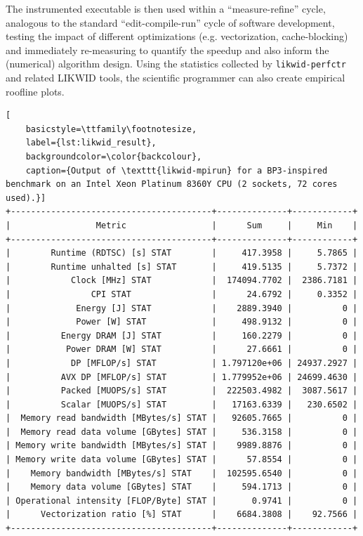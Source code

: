 \documentclass[a4paper,12pt]{article}
\begin{document}
The instrumented executable is then used within a ``measure-refine'' cycle, analogous
to the standard ``edit-compile-run'' cycle of software development, testing
the impact of different optimizations (e.g. vectorization, cache-blocking) and
immediately re-measuring to quantify the speedup and also inform the (numerical) algorithm design.
Using the statistics collected by \texttt{likwid-perfctr} and related LIKWID tools,
the scientific programmer can also create empirical roofline plots.

\begin{lstlisting}[
    basicstyle=\ttfamily\footnotesize,
    label={lst:likwid_result},
    backgroundcolor=\color{backcolour},
    caption={Output of \texttt{likwid-mpirun} for a BP3-inspired benchmark on an Intel Xeon Platinum 8360Y CPU (2 sockets, 72 cores used).}]
+----------------------------------------+--------------+------------+
|                 Metric                 |      Sum     |     Min    |
+----------------------------------------+--------------+------------+
|        Runtime (RDTSC) [s] STAT        |     417.3958 |     5.7865 |
|        Runtime unhalted [s] STAT       |     419.5135 |     5.7372 |
|            Clock [MHz] STAT            |  174094.7702 |  2386.7181 |
|                CPI STAT                |      24.6792 |     0.3352 |
|             Energy [J] STAT            |    2889.3940 |          0 |
|             Power [W] STAT             |     498.9132 |          0 |
|          Energy DRAM [J] STAT          |     160.2279 |          0 |
|           Power DRAM [W] STAT          |      27.6661 |          0 |
|            DP [MFLOP/s] STAT           | 1.797120e+06 | 24937.2927 |
|          AVX DP [MFLOP/s] STAT         | 1.779952e+06 | 24699.4630 |
|          Packed [MUOPS/s] STAT         |  222503.4982 |  3087.5617 |
|          Scalar [MUOPS/s] STAT         |   17163.6339 |   230.6502 |
|  Memory read bandwidth [MBytes/s] STAT |   92605.7665 |          0 |
|  Memory read data volume [GBytes] STAT |     536.3158 |          0 |
| Memory write bandwidth [MBytes/s] STAT |    9989.8876 |          0 |
| Memory write data volume [GBytes] STAT |      57.8554 |          0 |
|    Memory bandwidth [MBytes/s] STAT    |  102595.6540 |          0 |
|    Memory data volume [GBytes] STAT    |     594.1713 |          0 |
| Operational intensity [FLOP/Byte] STAT |       0.9741 |          0 |
|      Vectorization ratio [%] STAT      |    6684.3808 |    92.7566 |
+----------------------------------------+--------------+------------+
\end{lstlisting}
\end{document}
